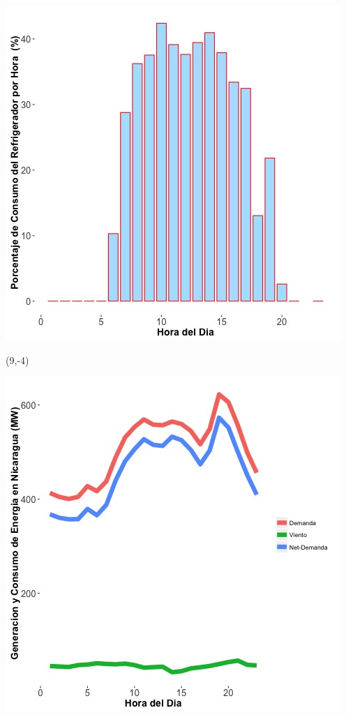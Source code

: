 \documentclass{article}\usepackage[]{graphicx}\usepackage[]{color}
\newenvironment{knitrout}{}{} %
\begin{document}
\begin{knitrout}
\color{fgcolor}
\includegraphics[scale=0.65]{figure/A24_fridge_energy_pct.jpg} 
\end{knitrout}

 \begin{textblock}{1}(9,-4)
\begin{minipage}{20em}
\begingroup

\endgroup
\end{minipage}
\end{textblock}

\begin{knitrout}
\color{fgcolor}
\includegraphics[scale=0.65]{figure/gridplot1.jpg} 
\end{knitrout}
\end{document}
